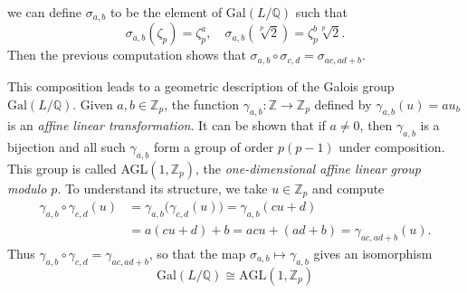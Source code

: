 \documentclass[leqno]{article}
\newcommand{\g}[1]{\text{Gal}(#1)}
\theoremstyle{definition}
\theoremstyle{remark}
\theoremstyle{definition}
\begin{document}
    we can define $\sigma_{a,b}$ to be the element of $\g{L/\mathbb{Q}}$ such that
        \begin{equation*}
            \sigma_{a,b}(\zeta_p)=\zeta_p^a,\quad\sigma_{a,b}(\sqrt[p]{2})=\zeta_p^b\sqrt[p]{2}.
        \end{equation*}
    Then the previous computation shows that $\sigma_{a,b}\circ\sigma_{c,d}=\sigma_{ac,ad+b}$.\par\hspace{4mm} This composition leads to a geometric description of the Galois group $\g{L/\mathbb{Q}}$. Given $a,b\in\mathbb{Z}_p$, the function $\gamma_{a,b}\colon\mathbb{Z}\rightarrow\mathbb{Z}_p$ defined by $\gamma_{a,b}(u)=au_b$ is an \emph{affine linear transformation}. It can be shown that if $a\neq 0$, then $\gamma_{a,b}$ is a bijection and all such $\gamma_{a,b}$ form a group of order $p(p-1)$ under composition. This group is called AGL$(1,\mathbb{Z}_p)$, the \emph{one-dimensional affine linear group modulo $p$}. To understand its structure, we take $u\in\mathbb{Z}_p$ and compute
        \begin{equation*}
            \begin{split}
                \gamma_{a,b}\circ\gamma_{c,d}(u)&=\gamma_{a,b}\big(\gamma_{c,d}(u)\big)=\gamma_{a,b}(cu+d) \\
                &= a(cu+d)+b=acu+(ad+b)=\gamma_{ac,ad+b}(u).
            \end{split}
        \end{equation*}
    Thus $\gamma_{a,b}\circ\gamma_{c,d}=\gamma_{ac,ad+b}$, so that the map $\sigma_{a,b}\mapsto\gamma_{a,b}$ gives an isomorphism
        \begin{equation*}
            \g{L/\mathbb{Q}}\cong\text{AGL}(1,\mathbb{Z}_p)
        \end{equation*}
    
    
    
\end{document}
